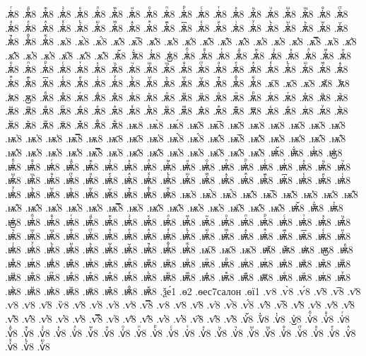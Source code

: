 {.ѫ҅ⷢ8
.ѫ҅ⷣ8
.ѫ҅ⷤ8
.ѫ҅ⷥ8
.ѫ҅ⷦ8
.ѫ҅ⷧ8
.ѫ҅ⷨ8
.ѫ҅ⷩ8
.ѫ҅ⷪ8
.ѫ҅ⷫ8
.ѫ҅ⷬ8
.ѫ҅ⷭ8
.ѫ҅ⷮ8
.ѫ҅ⷯ8
.ѫ҅ⷰ8
.ѫ҅ⷱ8
.ѫ҅ⷲ8
.ѫ҅ⷳ8
.ѫ҅ⷴ8
.ѫ҅ⷵ8
.ѫ҅ⷶ8
.ѫ҅ⷷ8
.ѫ҅ⷸ8
.ѫ҅ⷹ8
.ѫ҅ⷺ8
.ѫ҅ⷻ8
.ѫ҅ⷼ8
.ѫ҅ⷽ8
.ѫ҅ⷾ8
.ѫ҅ⷿ8
.ѫ҅꙯8
.ѫ҅ꙴ8
.ѫ҅ꙵ8
.ѫ҅ꙶ8
.ѫ҅ꙷ8
.ѫ҅ꙸ8
.ѫ҅ꙹ8
.ѫ҅ꙺ8
.ѫ҅ꙻ8
.ѫ҅꙼8
.ѫ҅꙽8
.ѫ҅ꚞ8
.ѫ҅ꚟ8
.ѫ҆8
.ѫ҆̀8
.ѫ҆́8
.ѫ҆̂8
.ѫ҆̅8
.ѫ҆̆8
.ѫ҆̇8
.ѫ҆̈8
.ѫ҆̋8
.ѫ҆̏8
.ѫ҆̑8
.ѫ҆̓8
.ѫ҆̔8
.ѫ҆̾8
.ѫ҆̿8
.ѫ҆͘8
.ѫ҆҃8
.ѫ҆҄8
.ѫ҆҅8
.ѫ҆҆8
.ѫ҆҇8
.ѫ҆᷀8
.ѫ҆᷁8
.ѫ҆᷶8
.ѫ᷷҆8
.ѫ᷸҆8
.ѫ᷹҆8
.ѫ҆ⷠ8
.ѫ҆ⷡ8
.ѫ҆ⷢ8
.ѫ҆ⷣ8
.ѫ҆ⷤ8
.ѫ҆ⷥ8
.ѫ҆ⷦ8
.ѫ҆ⷧ8
.ѫ҆ⷨ8
.ѫ҆ⷩ8
.ѫ҆ⷪ8
.ѫ҆ⷫ8
.ѫ҆ⷬ8
.ѫ҆ⷭ8
.ѫ҆ⷮ8
.ѫ҆ⷯ8
.ѫ҆ⷰ8
.ѫ҆ⷱ8
.ѫ҆ⷲ8
.ѫ҆ⷳ8
.ѫ҆ⷴ8
.ѫ҆ⷵ8
.ѫ҆ⷶ8
.ѫ҆ⷷ8
.ѫ҆ⷸ8
.ѫ҆ⷹ8
.ѫ҆ⷺ8
.ѫ҆ⷻ8
.ѫ҆ⷼ8
.ѫ҆ⷽ8
.ѫ҆ⷾ8
.ѫ҆ⷿ8
.ѫ҆꙯8
.ѫ҆ꙴ8
.ѫ҆ꙵ8
.ѫ҆ꙶ8
.ѫ҆ꙷ8
.ѫ҆ꙸ8
.ѫ҆ꙹ8
.ѫ҆ꙺ8
.ѫ҆ꙻ8
.ѫ҆꙼8
.ѫ҆꙽8
.ѫ҆ꚞ8
.ѫ҆ꚟ8
.ѫ҇8
.ѫ᷀8
.ѫ᷁8
.ѫ᷶8
.ѫ᷷8
.ѫ᷸8
.ѫ᷹8
.ѫⷠ8
.ѫⷡ8
.ѫⷢ8
.ѫⷣ8
.ѫⷤ8
.ѫⷥ8
.ѫⷦ8
.ѫⷧ8
.ѫⷨ8
.ѫⷩ8
.ѫⷪ8
.ѫⷫ8
.ѫⷬ8
.ѫⷭ8
.ѫⷮ8
.ѫⷯ8
.ѫⷰ8
.ѫⷱ8
.ѫⷲ8
.ѫⷳ8
.ѫⷴ8
.ѫⷵ8
.ѫⷶ8
.ѫⷷ8
.ѫⷸ8
.ѫⷹ8
.ѫⷺ8
.ѫⷻ8
.ѫⷼ8
.ѫⷽ8
.ѫⷾ8
.ѫⷿ8
.ѫ꙯8
.ѫꙴ8
.ѫꙵ8
.ѫꙶ8
.ѫꙷ8
.ѫꙸ8
.ѫꙹ8
.ѫꙺ8
.ѫꙻ8
.ѫ꙼8
.ѫ꙽8
.ѫꚞ8
.ѫꚟ8
.ѭ8
.ѭ̀8
.ѭ́8
.ѭ̂8
.ѭ̅8
.ѭ̆8
.ѭ̇8
.ѭ̈8
.ѭ̋8
.ѭ̏8
.ѭ̑8
.ѭ̓8
.ѭ̔8
.ѭ̾8
.ѭ̿8
.ѭ͘8
.ѭ҃8
.ѭ҄8
.ѭ҅8
.ѭ҅̀8
.ѭ҅́8
.ѭ҅̂8
.ѭ҅̅8
.ѭ҅̆8
.ѭ҅̇8
.ѭ҅̈8
.ѭ҅̋8
.ѭ҅̏8
.ѭ҅̑8
.ѭ҅̓8
.ѭ҅̔8
.ѭ҅̾8
.ѭ҅̿8
.ѭ҅͘8
.ѭ҅҃8
.ѭ҅҄8
.ѭ҅҅8
.ѭ҅҆8
.ѭ҅҇8
.ѭ҅᷀8
.ѭ҅᷁8
.ѭ҅᷶8
.ѭ᷷҅8
.ѭ᷸҅8
.ѭ᷹҅8
.ѭ҅ⷠ8
.ѭ҅ⷡ8
.ѭ҅ⷢ8
.ѭ҅ⷣ8
.ѭ҅ⷤ8
.ѭ҅ⷥ8
.ѭ҅ⷦ8
.ѭ҅ⷧ8
.ѭ҅ⷨ8
.ѭ҅ⷩ8
.ѭ҅ⷪ8
.ѭ҅ⷫ8
.ѭ҅ⷬ8
.ѭ҅ⷭ8
.ѭ҅ⷮ8
.ѭ҅ⷯ8
.ѭ҅ⷰ8
.ѭ҅ⷱ8
.ѭ҅ⷲ8
.ѭ҅ⷳ8
.ѭ҅ⷴ8
.ѭ҅ⷵ8
.ѭ҅ⷶ8
.ѭ҅ⷷ8
.ѭ҅ⷸ8
.ѭ҅ⷹ8
.ѭ҅ⷺ8
.ѭ҅ⷻ8
.ѭ҅ⷼ8
.ѭ҅ⷽ8
.ѭ҅ⷾ8
.ѭ҅ⷿ8
.ѭ҅꙯8
.ѭ҅ꙴ8
.ѭ҅ꙵ8
.ѭ҅ꙶ8
.ѭ҅ꙷ8
.ѭ҅ꙸ8
.ѭ҅ꙹ8
.ѭ҅ꙺ8
.ѭ҅ꙻ8
.ѭ҅꙼8
.ѭ҅꙽8
.ѭ҅ꚞ8
.ѭ҅ꚟ8
.ѭ҆8
.ѭ҆̀8
.ѭ҆́8
.ѭ҆̂8
.ѭ҆̅8
.ѭ҆̆8
.ѭ҆̇8
.ѭ҆̈8
.ѭ҆̋8
.ѭ҆̏8
.ѭ҆̑8
.ѭ҆̓8
.ѭ҆̔8
.ѭ҆̾8
.ѭ҆̿8
.ѭ҆͘8
.ѭ҆҃8
.ѭ҆҄8
.ѭ҆҅8
.ѭ҆҆8
.ѭ҆҇8
.ѭ҆᷀8
.ѭ҆᷁8
.ѭ҆᷶8
.ѭ᷷҆8
.ѭ᷸҆8
.ѭ᷹҆8
.ѭ҆ⷠ8
.ѭ҆ⷡ8
.ѭ҆ⷢ8
.ѭ҆ⷣ8
.ѭ҆ⷤ8
.ѭ҆ⷥ8
.ѭ҆ⷦ8
.ѭ҆ⷧ8
.ѭ҆ⷨ8
.ѭ҆ⷩ8
.ѭ҆ⷪ8
.ѭ҆ⷫ8
.ѭ҆ⷬ8
.ѭ҆ⷭ8
.ѭ҆ⷮ8
.ѭ҆ⷯ8
.ѭ҆ⷰ8
.ѭ҆ⷱ8
.ѭ҆ⷲ8
.ѭ҆ⷳ8
.ѭ҆ⷴ8
.ѭ҆ⷵ8
.ѭ҆ⷶ8
.ѭ҆ⷷ8
.ѭ҆ⷸ8
.ѭ҆ⷹ8
.ѭ҆ⷺ8
.ѭ҆ⷻ8
.ѭ҆ⷼ8
.ѭ҆ⷽ8
.ѭ҆ⷾ8
.ѭ҆ⷿ8
.ѭ҆꙯8
.ѭ҆ꙴ8
.ѭ҆ꙵ8
.ѭ҆ꙶ8
.ѭ҆ꙷ8
.ѭ҆ꙸ8
.ѭ҆ꙹ8
.ѭ҆ꙺ8
.ѭ҆ꙻ8
.ѭ҆꙼8
.ѭ҆꙽8
.ѭ҆ꚞ8
.ѭ҆ꚟ8
.ѭ҇8
.ѭ᷀8
.ѭ᷁8
.ѭ᷶8
.ѭ᷷8
.ѭ᷸8
.ѭ᷹8
.ѭⷠ8
.ѭⷡ8
.ѭⷢ8
.ѭⷣ8
.ѭⷤ8
.ѭⷥ8
.ѭⷦ8
.ѭⷧ8
.ѭⷨ8
.ѭⷩ8
.ѭⷪ8
.ѭⷫ8
.ѭⷬ8
.ѭⷭ8
.ѭⷮ8
.ѭⷯ8
.ѭⷰ8
.ѭⷱ8
.ѭⷲ8
.ѭⷳ8
.ѭⷴ8
.ѭⷵ8
.ѭⷶ8
.ѭⷷ8
.ѭⷸ8
.ѭⷹ8
.ѭⷺ8
.ѭⷻ8
.ѭⷼ8
.ѭⷽ8
.ѭⷾ8
.ѭⷿ8
.ѭ꙯8
.ѭꙴ8
.ѭꙵ8
.ѭꙶ8
.ѭꙷ8
.ѭꙸ8
.ѭꙹ8
.ѭꙺ8
.ѭꙻ8
.ѭ꙼8
.ѭ꙽8
.ѭꚞ8
.ѭꚟ8
.ѯе́1
.ѳ2
.ѳес7салон
.ѳї1
.ѵ8
.ѵ̀8
.ѵ́8
.ѵ̂8
.ѵ̅8
.ѵ̆8
.ѵ̇8
.ѵ̈8
.ѵ̋8
.ѷ8
.ѵ̑8
.ѵ̓8
.ѵ̔8
.ѵ̾8
.ѵ̿8
.ѵ͘8
.ѵ҃8
.ѵ҄8
.ѵ҅8
.ѵ҅̀8
.ѵ҅́8
.ѵ҅̂8
.ѵ҅̅8
.ѵ҅̆8
.ѵ҅̇8
.ѵ҅̈8
.ѵ҅̋8
.ѵ҅̏8
.ѵ҅̑8
.ѵ҅̓8
.ѵ҅̔8
.ѵ҅̾8
.ѵ҅̿8
.ѵ҅͘8
.ѵ҅҃8
.ѵ҅҄8
.ѵ҅҅8
.ѵ҅҆8
.ѵ҅҇8
.ѵ҅᷀8
.ѵ҅᷁8
.ѵ҅᷶8
.ѵ᷷҅8
.ѵ᷸҅8
.ѵ᷹҅8
.ѵ҅ⷠ8
.ѵ҅ⷡ8
.ѵ҅ⷢ8
.ѵ҅ⷣ8
.ѵ҅ⷤ8
.ѵ҅ⷥ8
.ѵ҅ⷦ8
.ѵ҅ⷧ8
.ѵ҅ⷨ8
.ѵ҅ⷩ8
.ѵ҅ⷪ8
.ѵ҅ⷫ8
.ѵ҅ⷬ8
.ѵ҅ⷭ8
.ѵ҅ⷮ8
.ѵ҅ⷯ8
.ѵ҅ⷰ8
.ѵ҅ⷱ8
.ѵ҅ⷲ8
.ѵ҅ⷳ8
.ѵ҅ⷴ8
.ѵ҅ⷵ8
.ѵ҅ⷶ8
.ѵ҅ⷷ8
.ѵ҅ⷸ8
.ѵ҅ⷹ8
.ѵ҅ⷺ8
.ѵ҅ⷻ8
}
